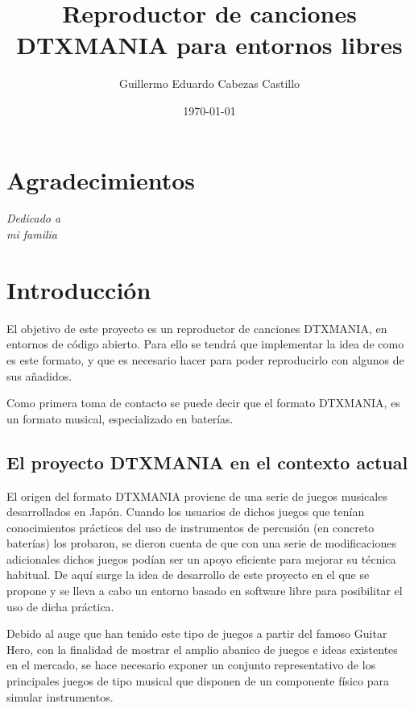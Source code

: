 \documentclass[a4paper,11pt,oneside]{book}
\begin{document}
 
\title{Reproductor de canciones DTXMANIA para entornos libres}
\author{Guillermo Eduardo Cabezas Castillo}
\date{\today}

\maketitle 

\tableofcontents
\listoffigures
\chapter*{Agradecimientos}
\begin{flushright}
\textit{Dedicado a \\
mi familia}
\end{flushright}

\chapter{Introducción}

	 El objetivo de este proyecto es un reproductor de canciones DTXMANIA, en entornos de código abierto. Para ello se tendrá que implementar la idea de como es este formato, y que es necesario hacer para poder reproducirlo con algunos de sus añadidos.


\par
  Como primera toma de contacto se puede decir que el formato DTXMANIA, es un formato musical, especializado en baterías.

\section{El proyecto DTXMANIA en el contexto actual}
  
  El origen del formato DTXMANIA proviene de una serie de juegos musicales desarrollados en Japón. Cuando los usuarios de dichos juegos que tenían conocimientos prácticos del uso de instrumentos de percusión (en concreto baterías) los probaron, se dieron cuenta de que con una serie de modificaciones adicionales dichos juegos podían ser un apoyo eficiente para mejorar su técnica habitual. De aquí surge la idea de desarrollo de este proyecto en el que se propone y se lleva a cabo un entorno basado en software libre para posibilitar el uso de dicha práctica.
  
  Debido al auge que han tenido este tipo de juegos a partir del famoso \gls{Guitar Hero}, con la finalidad de mostrar el amplio abanico de juegos e ideas existentes en el mercado, se hace necesario exponer un conjunto representativo de los principales juegos de tipo musical que disponen de un componente físico para simular instrumentos.
  
\end{document}
